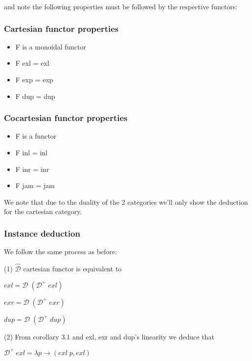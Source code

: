 \documentclass[11pt,a4]{article}
\newcommand{\Varid}[1]{\mathit{#1}}
\theoremstyle{definition}
\theoremstyle{Definition}
\theoremstyle{Definition}
\begin{document}
and note the following properties must be followed by the respective functors:

\subsubsection{Cartesian functor properties}

\begin{itemize}
    \item F is a monoidal functor
    \item F exl = exl
    \item F exp = exp
    \item F dup = dup
\end{itemize}


\subsubsection{Cocartesian functor properties}

\begin{itemize}
    \item F is a functor
    \item F inl = inl
    \item F inr = inr
    \item F jam = jam
\end{itemize}

We note that due to the duality of the 2 categories we'll only show the deduction for the cartesian category.


\subsubsection{Instance deduction}

We follow the same process as before:

(1) \ensuremath{\mathcal{\hat{D}}} cartesian functor is equivalent to

\ensuremath{\Varid{exl}\mathrel{=}\mathcal{D}\;(\mathcal{D}^{+}\;\Varid{exl})}

\ensuremath{\Varid{exr}\mathrel{=}\mathcal{D}\;(\mathcal{D}^{+}\;\Varid{exr})}

\ensuremath{\Varid{dup}\mathrel{=}\mathcal{D}\;(\mathcal{D}^{+}\;\Varid{dup})}

(2) From corollary 3.1 and exl, exr and dup's linearity we deduce that

\ensuremath{\mathcal{D}^{+}\;\Varid{exl}\mathrel{=}\lambda \Varid{p}\rightarrow (\Varid{exl}\;\Varid{p},\Varid{exl})}
\end{document}
